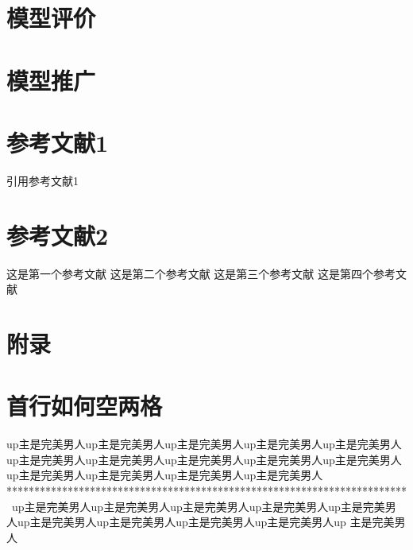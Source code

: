 \documentclass{article}
\renewcommand{\baselinestretch}{1.2}                        %
\begin{document}
\section{模型评价}
\newpage                                                    %
\section{模型推广}
\newpage
\section{参考文献1}
\cite{ref1}引用参考文献1                                     %
\section{参考文献2}
\renewcommand{\baselinestretch}{0.01}                       %
\begin{thebibliography}{99}                                 %
这是第一个参考文献
这是第二个参考文献
这是第三个参考文献
这是第四个参考文献
\end{thebibliography}
\newpage                                                    %
\section{附录}
\section{首行如何空两格}
up主是完美男人up主是完美男人up主是完美男人up主是完美男人up主是完美男人up主是完美男人up主是完美男人up主是完美男人up主是完美男人up主是完美男人up主是完美男人up主是完美男人up主是完美男人up主是完美男人\\
************************************************************************\\
\indent\qquad\  up主是完美男人up主是完美男人up主是完美男人up主是完美男人up主是完美男人up主是完美男人up主是完美男人up主是完美男人up主是完美男人up 主是完美男人\\
\newpage                                                    %
\end{document}
